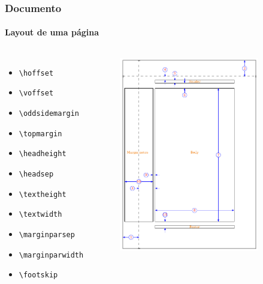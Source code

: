 \begin{frame}[fragile]
\frametitle{Documento}
\framesubtitle{Layout de uma página}
  \scriptsize
  \begin{columns}[c]
  \begin{itemize}
  \item \verb|\hoffset|
  \item \verb|\voffset|
  \item \verb|\oddsidemargin|
  \item \verb|\topmargin|
  \item \verb|\headheight|
  \item \verb|\headsep|
  \item \verb|\textheight| 
  \item \verb|\textwidth|
  \item \verb|\marginparsep|
  \item \verb|\marginparwidth|
  \item \verb|\footskip|
  \end{itemize}
  \vspace{-1.5cm}
\begin{figure}[h!]
  \centering
  \label{fig:Latex_layout}
    \includegraphics[width=0.85\textwidth]{figures/Latex_layout.pdf}
\end{figure}
  \end{columns}
\end{frame}


